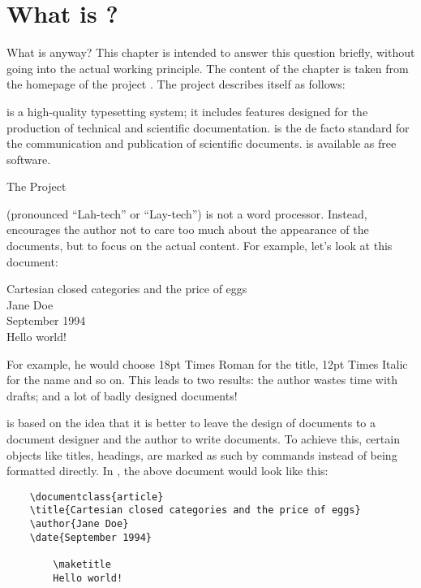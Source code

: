 
\chapter{What is \Latex?}
What is \Latex anyway? This chapter is intended to answer this question briefly, without going into the actual working principle. The content of the chapter is taken from the homepage of the \Latex project \cite{TheLaTeXProject.2020}. The project describes \Latex itself as follows:

\bgroup
\setlength\beforeepigraphskip{0pt} %
\epigraph{\Latex is a high-quality typesetting system; it includes features designed for the production of technical and scientific documentation. \Latex is the de facto standard for the communication and publication of scientific documents. \Latex is available as free software.}{The \Latex Project}
\egroup

\Latex (pronounced \enquote{Lah-tech} or \enquote{Lay-tech}) is not a word processor. Instead, \Latex encourages the author not to care too much about the appearance of the documents, but to focus on the actual content. For example, let's look at this document: 

\begin{example}
	Cartesian closed categories and the price of eggs \\
	Jane Doe \\
	September 1994 \\
	
	Hello world!
\end{example}

For example, he would choose 18pt Times Roman for the title, 12pt Times Italic for the name and so on. This leads to two results: the author wastes time with drafts; and a lot of badly designed documents!

\Latex is based on the idea that it is better to leave the design of documents to a document designer and the author to write documents. To achieve this, certain objects like titles, headings, \etc are marked as such by commands instead of being formatted directly. In \Latex, the above document would look like this:

\begin{lstlisting}
	\documentclass{article}
	\title{Cartesian closed categories and the price of eggs}
	\author{Jane Doe}
	\date{September 1994}
	
		\maketitle
		Hello world!
	
\end{lstlisting}

